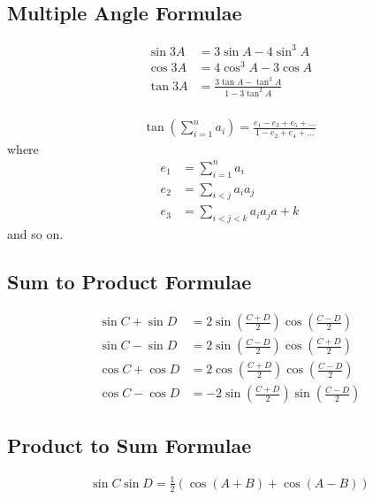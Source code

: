 \documentclass[12pt]{article}
\newcommand{\pwidth}{0.46\linewidth}
\begin{document}
	\hfill
	\begin{minipage}[t]{\pwidth}
		\subsection{Multiple Angle Formulae}
		\begin{align}
			\sin 3A &= 3\sin A - 4\sin^3A \\
			\cos 3A &= 4\cos^3A - 3\cos A \\
			\tan 3A &= \frac{3\tan A - \tan^3A}{1 - 3\tan^2A}
		\end{align}
		\\
		\begin{align}
			\tan\left(\displaystyle \sum_{i=1}^n a_i\right) = \frac{e_1 - e_3 + e_5 + ...}{1 - e_2 + e_4 + ...}
		\end{align}
		where \vspace{-10pt}
		\begin{align}
			e_1 &= \displaystyle \sum_{i=1}^n a_i \nonumber\\
			e_2 &= \displaystyle \sum_{i < j} a_i a_j \nonumber\\
			e_3 &= \displaystyle \sum_{i < j < k} a_i a_j a+k \nonumber
		\end{align}
		and so on.
		
		\subsection{Sum to Product Formulae}
		\begin{align}
			\sin C + \sin D &= 2\sin\left(\frac{C+D}2\right)\cos\left(\frac{C-D}2\right) \\
			\sin C - \sin D &= 2\sin\left(\frac{C-D}2\right)\cos\left(\frac{C+D}2\right) \\
			\cos C + \cos D &= 2\cos\left(\frac{C+D}2\right)\cos\left(\frac{C-D}2\right) \\
			\cos C - \cos D &= -2\sin\left(\frac{C+D}2\right)\sin\left(\frac{C-D}2\right)
		\end{align}
	\end{minipage}
	
	\pagebreak
	
	\begin{minipage}[t]{\pwidth}
		\subsection{Product to Sum Formulae}
		\begin{align}
			\sin C \sin D = \frac 12 (\cos(A+B) + \cos(A-B))
		\end{align}
	\end{minipage}%
	\hfill
	\begin{minipage}[t]{\pwidth}
		
	\end{minipage}
		
\end{document}
